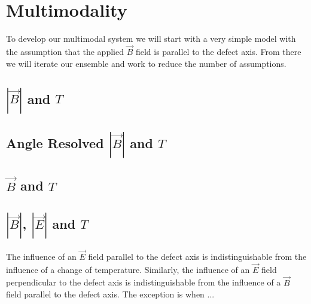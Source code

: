 \section{Multimodality}
To develop our multimodal system we will start with a very simple model with the assumption that the applied $\vec{B}$ field is parallel to the defect axis. From there we will iterate our ensemble and work to reduce the number of assumptions.


\subsection{$|\vec{B}|$ and $T$}
\cite{Degen2008}

\subsection{Angle Resolved $|\vec{B}|$ and $T$}
\cite{PhysRevApplied.4.014009}

\subsection{$\vec{B}$ and $T$}


\subsection{$|\vec{B}|$, $|\vec{E}|$ and $T$}
The influence of an $\vec{E}$ field parallel to the defect axis is indistinguishable from the influence of a change of temperature. Similarly, the influence of an $\vec{E}$ field perpendicular to the defect axis is indistinguishable from the influence of a $\vec{B}$ field parallel to the defect axis. The exception is when ...

\begin{figure}[H]
	\begin{center}
	\end{center}
	\caption{}\label{fig:}
\end{figure}


